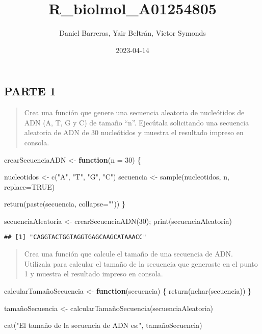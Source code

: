 \documentclass[
]{article}
\title{R\_biolmol\_A01254805}
\author{Daniel Barreras, Yair Beltrán, Victor Symonds}
\date{2023-04-14}
\newenvironment{Shaded}{\begin{snugshade}}{\end{snugshade}}
\newcommand{\AttributeTok}[1]{\textcolor[rgb]{0.77,0.63,0.00}{#1}}
\newcommand{\ConstantTok}[1]{\textcolor[rgb]{0.00,0.00,0.00}{#1}}
\newcommand{\ControlFlowTok}[1]{\textcolor[rgb]{0.13,0.29,0.53}{\textbf{#1}}}
\newcommand{\DecValTok}[1]{\textcolor[rgb]{0.00,0.00,0.81}{#1}}
\newcommand{\FunctionTok}[1]{\textcolor[rgb]{0.00,0.00,0.00}{#1}}
\newcommand{\NormalTok}[1]{#1}
\newcommand{\OtherTok}[1]{\textcolor[rgb]{0.56,0.35,0.01}{#1}}
\newcommand{\StringTok}[1]{\textcolor[rgb]{0.31,0.60,0.02}{#1}}
\begin{document}
\maketitle

\hypertarget{parte-1}{%
\subsection{PARTE 1}\label{parte-1}}

\begin{quote}
Crea una función que genere una secuencia aleatoria de nucleótidos de
ADN (A, T, G y C) de tamaño ``n''. Ejecútala solicitando una secuencia
aleatoria de ADN de 30 nucleótidos y muestra el resultado impreso en
consola.
\end{quote}

\begin{Shaded}
\begin{Highlighting}[]
\NormalTok{crearSecuenciaADN }\OtherTok{\textless{}{-}} \ControlFlowTok{function}\NormalTok{(}\AttributeTok{n =} \DecValTok{30}\NormalTok{) \{}
  
\NormalTok{  nucleotidos }\OtherTok{\textless{}{-}} \FunctionTok{c}\NormalTok{(}\StringTok{"A"}\NormalTok{, }\StringTok{"T"}\NormalTok{, }\StringTok{"G"}\NormalTok{, }\StringTok{"C"}\NormalTok{)}
\NormalTok{  secuencia }\OtherTok{\textless{}{-}} \FunctionTok{sample}\NormalTok{(nucleotidos, n, }\AttributeTok{replace=}\ConstantTok{TRUE}\NormalTok{)}
  
  \FunctionTok{return}\NormalTok{(}\FunctionTok{paste}\NormalTok{(secuencia, }\AttributeTok{collapse=}\StringTok{""}\NormalTok{))}
\NormalTok{\}}


\NormalTok{secuenciaAleatoria }\OtherTok{\textless{}{-}} \FunctionTok{crearSecuenciaADN}\NormalTok{(}\DecValTok{30}\NormalTok{);}
\FunctionTok{print}\NormalTok{(secuenciaAleatoria)}
\end{Highlighting}
\end{Shaded}

\begin{verbatim}
## [1] "CAGGTACTGGTAGGTGAGCAAGCATAAACC"
\end{verbatim}

\begin{quote}
Crea una función que calcule el tamaño de una secuencia de ADN.
Utilízala para calcular el tamaño de la secuencia que generaste en el
punto 1 y muestra el resultado impreso en consola.
\end{quote}

\begin{Shaded}
\begin{Highlighting}[]
\NormalTok{calcularTamañoSecuencia }\OtherTok{\textless{}{-}} \ControlFlowTok{function}\NormalTok{(secuencia) \{}
  \FunctionTok{return}\NormalTok{(}\FunctionTok{nchar}\NormalTok{(secuencia))}
\NormalTok{\}}

\NormalTok{tamañoSecuencia }\OtherTok{\textless{}{-}}\NormalTok{ calcularTamañoSecuencia(secuenciaAleatoria)}

\FunctionTok{cat}\NormalTok{(}\StringTok{"El tamaño de la secuencia de ADN es:"}\NormalTok{, tamañoSecuencia)}
\end{Highlighting}
\end{Shaded}
\end{document}
